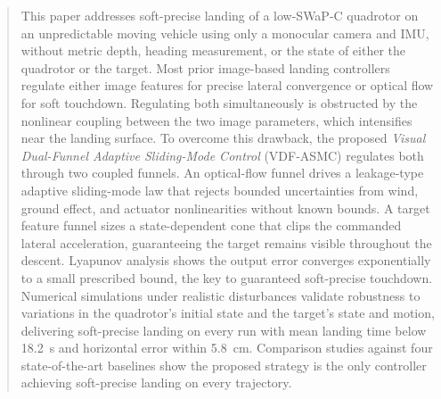 \documentclass{IEEEtaes}
\begin{document}
\begin{abstract}This paper addresses soft-precise landing of a low-SWaP-C quadrotor on an unpredictable moving vehicle using only a monocular camera and IMU, without metric depth, heading measurement, or the state of either the quadrotor or the target. Most prior image-based landing controllers regulate either image features for precise lateral convergence or optical flow for soft touchdown. Regulating both simultaneously is obstructed by the nonlinear coupling between the two image parameters, which intensifies near the landing surface. To overcome this drawback, the proposed \emph{Visual Dual-Funnel Adaptive Sliding-Mode Control} (VDF-ASMC) regulates both through two coupled funnels. An optical-flow funnel drives a leakage-type adaptive sliding-mode law that rejects bounded uncertainties from wind, ground effect, and actuator nonlinearities without known bounds. A target feature funnel sizes a state-dependent cone that clips the commanded lateral acceleration, guaranteeing the target remains visible throughout the descent. Lyapunov analysis shows the output error converges exponentially to a small prescribed bound, the key to guaranteed soft-precise touchdown. Numerical simulations under realistic disturbances validate robustness to variations in the quadrotor's initial state and the target's state and motion, delivering soft-precise landing on every run with mean landing time below 18.2~s and horizontal error within 5.8~cm. Comparison studies against four state-of-the-art baselines show the proposed strategy is the only controller achieving soft-precise landing on every trajectory.
\end{abstract}

\end{document}
